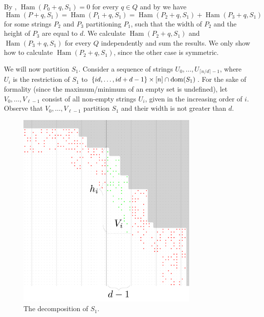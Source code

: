 \documentclass[11pt, letterpaper]{article}
\theoremstyle{plain}
\theoremstyle{definition}
\theoremstyle{remark}
\newcommand{\set}[1]{\left\lbrace #1 \right\rbrace}
\DeclareMathOperator*{\Ham}{Ham}
\begin{document}
By , $\Ham(P_0 + q, S_1) = 0$ for every $q \in Q$
and by  we have 
\[\Ham(P + q, S_1) = \Ham(P_1 + q, S_1) = \Ham(P_2 + q, S_1) + \Ham(P_3 + q, S_1) \]
for some strings $P_2$ and $P_3$ partitioning $P_1$, such that the width of $P_2$ and the height of $P_3$ are equal to $d$.
We calculate $\Ham(P_2 + q, S_1)$ and $\Ham(P_3 + q, S_1)$ for every $Q$ independently and sum the results.
We only show how to calculate $\Ham(P_2 + q, S_1)$, since the other case is symmetric.

We will now partition $S_1$.
Consider a sequence of strings $U_0, \dots, U_{\lceil n / d \rceil - 1}$, where $U_i$ is the restriction of $S_1$ to $\set{id, \dots, id + d - 1} \times [n] \cap \d{S_1}$.
For the sake of formality (since the maximum/minimum of an empty set is undefined), let $V_0, \dots, V_{\ell - 1}$ consist of all non-empty strings $U_i$, given in the increasing order of $i$.
Observe that $V_0, \dots, V_{\ell - 1}$ partition $S_1$ and their width is not greater than $d$.

\begin{figure}[!t]
	\begin{center}
		\includegraphics[width=0.8\textwidth]{drawings/periphery_decomposition}
	\end{center}
	\caption{The decomposition of $S_1$.}
	\label{figure:periphery_decomposition}
\end{figure}
\end{document}
